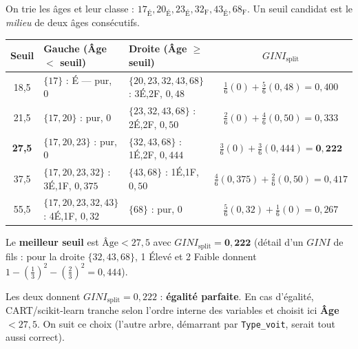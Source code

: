 \begin{Calcul}
On trie les âges et leur classe : $17_{\text{É}}, 20_{\text{É}}, 23_{\text{É}}, 32_{\text{F}},
43_{\text{É}}, 68_{\text{F}}$. Un seuil candidat est le \emph{milieu} de deux âges consécutifs.
\begin{center}\small
\renewcommand{\arraystretch}{1.3}
\begin{tabular}{c l l c}
\toprule
Seuil & Gauche (Âge $<$ seuil) & Droite (Âge $\geq$ seuil) & $GINI_{\text{split}}$\\
\midrule
18,5 & $\{17\}$ : É — pur, $0$ & $\{20,23,32,43,68\}$ : 3É,2F, $0{,}48$ &
  $\tfrac16(0)+\tfrac56(0{,}48)=0{,}400$\\
21,5 & $\{17,20\}$ : pur, $0$ & $\{23,32,43,68\}$ : 2É,2F, $0{,}50$ &
  $\tfrac26(0)+\tfrac46(0{,}50)=0{,}333$\\
\rowcolor{vertclair}\textbf{27,5} & $\{17,20,23\}$ : pur, $0$ & $\{32,43,68\}$ : 1É,2F, $0{,}444$ &
  $\tfrac36(0)+\tfrac36(0{,}444)=\mathbf{0{,}222}$\\
37,5 & $\{17,20,23,32\}$ : 3É,1F, $0{,}375$ & $\{43,68\}$ : 1É,1F, $0{,}50$ &
  $\tfrac46(0{,}375)+\tfrac26(0{,}50)=0{,}417$\\
55,5 & $\{17,20,23,32,43\}$ : 4É,1F, $0{,}32$ & $\{68\}$ : pur, $0$ &
  $\tfrac56(0{,}32)+\tfrac16(0)=0{,}267$\\
\bottomrule
\end{tabular}
\end{center}
Le \textbf{meilleur seuil} est $\text{Âge}<27{,}5$ avec $GINI_{\text{split}}=\mathbf{0{,}222}$
(détail d'un $GINI$ de fils : pour la droite $\{32,43,68\}$, 1 Élevé et 2 Faible donnent
$1-(\tfrac13)^2-(\tfrac23)^2=0{,}444$).
\end{Calcul}

\begin{Astuce}
Les deux donnent $GINI_{\text{split}}=0{,}222$ : \textbf{égalité parfaite}. En cas d'égalité,
CART/scikit-learn tranche selon l'ordre interne des variables et choisit ici
\textbf{Âge $<27{,}5$}. On suit ce choix (l'autre arbre, démarrant par \texttt{Type\_voit},
serait tout aussi correct).
\end{Astuce}

